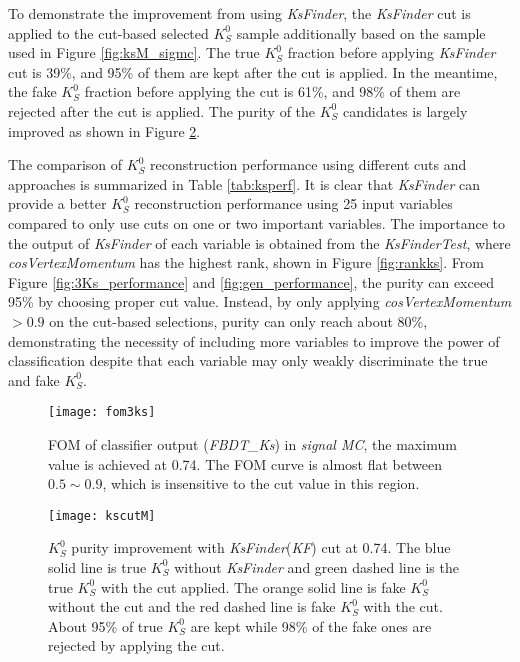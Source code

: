 To demonstrate the improvement from using \textit{KsFinder}, the \textit{KsFinder} cut is applied to the cut-based selected $K_S^0$ sample additionally based on the sample used in Figure \ref{fig:ksM_sigmc}.  The true $K_S^0$ fraction before applying \textit{KsFinder} cut is 39\%, and 95\% of them are kept after the cut is applied. In the meantime, the fake $K_S^0$ fraction before applying the cut is 61\%, and 98\% of them are rejected after the cut is applied. The purity of the $K_S^0$ candidates is largely improved as shown in Figure \ref{fig:ks_cutused}. 

The comparison of $K_S^0$ reconstruction performance using different cuts and approaches is summarized in Table \ref{tab:ksperf}.  It is clear that \textit{KsFinder} can provide a better $K_S^0$ reconstruction performance using 25 input variables compared to only use cuts on one or two important variables. The importance to the output of \textit{KsFinder} of each variable is obtained from the \textit{KsFinderTest}, where \textit{cosVertexMomentum} has the highest rank, shown in Figure \ref{fig:rankks}. From Figure \ref{fig:3Ks_performance} and \ref{fig:gen_performance}, the purity can exceed 95\% by choosing proper cut value. Instead, by only applying \textit{cosVertexMomentum}$>0.9$ on the cut-based selections, purity can only reach about 80\%, demonstrating the necessity of including more variables to improve the power of classification despite that each variable may only weakly discriminate the true and fake $K_S^0$.


\begin{figure}[htpb]
	\centering
	\texttt{[image: fom3ks]}
	\caption{FOM of classifier output (\textit{FBDT\_Ks}) in \textit{signal MC}, the maximum value is achieved at 0.74. The FOM curve is almost flat between $0.5\sim 0.9$, which is insensitive to the cut value in this region.} 
	\label{fig:ks_fom}
\end{figure}





\begin{figure}[htpb]
	\centering
	\texttt{[image: kscutM]}
	\caption{$K_S^0$ purity improvement with \textit{KsFinder}(\textit{KF}) cut at 0.74. The blue solid line is true $K_S^0$ without \textit{KsFinder} and green dashed line is the true $K_S^0$ with the cut applied. The orange solid line is fake $K_S^0$ without the cut and the red dashed line is fake $K_S^0$ with the cut. About 95\% of true $K_S^0$ are kept while 98\% of the fake ones are rejected by applying the cut.}
	\label{fig:ks_cutused}
\end{figure}

